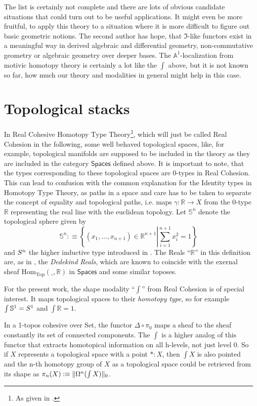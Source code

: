 \documentclass[9pt,twosided]{amsart}
\newcommand{\shape}{\int}
\newcommand{\bR}{\mathbb R}
\newcommand{\bA}{\mathbb A}
\newcommand{\bS}{\mathbb S}
\newcommand{\Spaces}{\ensuremath{\mathsf{Spaces}}}
\begin{document}
\bigskip
The list is certainly not complete and there are lots of obvious candidate situations that could turn out to be useful applications.
It might even be more fruitful, to apply this theory to a situation where it is more difficult to figure out basic geometric notions.
The second author has hope, that $\Im$-like functors exist in a meaningful way in derived algebraic and differential geometry, non-commutative geometry or algebraic geometry over deeper bases. The $\bA^1$-localization from motivic homotopy theory is certainly a lot like the $\shape$ above, but it is not known so far, how much our theory and modalities in general might help in this case.

\section{Topological stacks}
\label{sec:topological_stacks}
In Real Cohesive Homotopy Type Theory\footnote{As given in \cite{ShulmanRealCohesion}.},
which will just be called Real Cohesion in the following, 
some well behaved topological spaces, like, for example, topological manifolds
are supposed to be included in the theory as they are included in the category $\Spaces$ defined above.
It is important to note, that the types corresponding to these topological spaces
are 0-types in Real Cohesion.
This can lead to confusion with the common explanation for the Identity types in Homotopy Type Theory,
as paths in a space and care has to be taken to separate the concept of equality
and topological paths, i.e. maps $\gamma:\bR\to X$ from the 0-type $\bR$ representing the real line with the euclidean topology.
Let $\bS^{n}$ denote the topological sphere given by
\[ \bS^{n}:\equiv\left\{ (x_1,\dots,x_{n+1})\in\bR^{n+1}\left\vert \sum_{i=1}^{n+1}x_i^2=1\right.\right\}\]
and $S^{n}$ the higher inductive type introduced in \cite{UFP}.
The Reals ``$\bR$'' in this definition are, as in \cite{ShulmanRealCohesion}, the \emph{Dedekind Reals},
which are known to coincide with the exernal sheaf $\mathrm{Hom}_{\mathrm{Top}}(\_,\bR)$ in $\Spaces$ and some similar toposes.

For the present work, the shape modality ``$\shape$'' from Real Cohesion is of special interest.
It maps topological spaces to their \emph{homotopy type}, so for example $\shape \bS^{1} =\sphere{1}$ 
and $\shape \bR =1$.


In a 1-topos cohesive over Set, the functor $\Delta\circ\pi_0$ maps a sheaf to the sheaf constantly its set of connected components.
The $\shape$ is a higher analog of this functor that extracts homotopical information on all h-levels, not just level 0.
So if $X$ represents a topological space with a point $\ast: X$, 
then $\shape X$ is also pointed and the n-th homotopy group of $X$ as a topological space 
could be retrieved from its shape 
as $\pi_n(X):\equiv\trunc{0}{\Omega^n(\shape X)}$.
\end{document}
